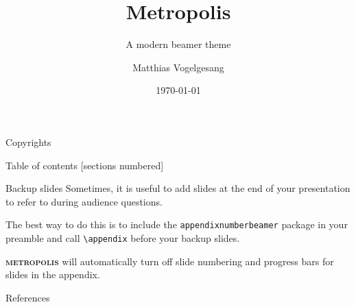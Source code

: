 \documentclass{ctslice}
\title{Metropolis}
\subtitle{A modern beamer theme}
\date{\today}
\author{Matthias Vogelgesang}
\institute{Center for modern beamer themes}
\newcommand{\themename}{\textbf{\textsc{metropolis}}\xspace}
\begin{document}
\maketitle

\begin{frame}[fragile]{Copyrights}
    
\end{frame}

\begin{frame}{Table of contents}
    [sections numbered]
    \tableofcontents[hideallsubsections]
\end{frame}









\appendix

\begin{frame}[fragile]{Backup slides}
    Sometimes, it is useful to add slides at the end of your presentation to
    refer to during audience questions.

    The best way to do this is to include the \verb|appendixnumberbeamer|
    package in your preamble and call \verb|\appendix| before your backup slides.

    \themename will automatically turn off slide numbering and progress bars for
    slides in the appendix.
\end{frame}

\begin{frame}[allowframebreaks]{References}

    \listofbib[metropolisdemo]

\end{frame}
\end{document}
